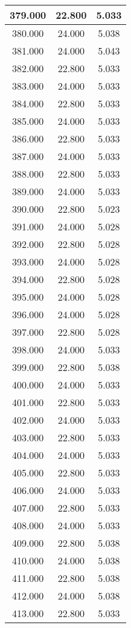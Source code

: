 \documentclass[11pt,a4paper]{jsarticle}
\begin{document}
\begin{center}
\begin{longtable}{|c|c|c|}
379.000	 & 22.800&  5.033 \\ \hline
380.000	 & 24.000&  5.038 \\ \hline
381.000	 & 24.000&  5.043 \\ \hline
382.000	 & 22.800&  5.033 \\ \hline
383.000	 & 24.000&  5.033 \\ \hline
384.000	 & 22.800&  5.033 \\ \hline
385.000	 & 24.000&  5.033 \\ \hline
386.000	 & 22.800&  5.033 \\ \hline
387.000	 & 24.000&  5.033 \\ \hline
388.000	 & 22.800&  5.033 \\ \hline
389.000	 & 24.000&  5.033 \\ \hline
390.000	 & 22.800&  5.023 \\ \hline
391.000	 & 24.000&  5.028 \\ \hline
392.000	 & 22.800&  5.028 \\ \hline
393.000	 & 24.000&  5.028 \\ \hline
394.000	 & 22.800&  5.028 \\ \hline
395.000	 & 24.000&  5.028 \\ \hline
396.000	 & 24.000&  5.028 \\ \hline
397.000	 & 22.800&  5.028 \\ \hline
398.000	 & 24.000&  5.033 \\ \hline
399.000	 & 22.800&  5.038 \\ \hline
400.000	 & 24.000&  5.033 \\ \hline
401.000	 & 22.800&  5.033 \\ \hline
402.000	 & 24.000&  5.033 \\ \hline
403.000	 & 22.800&  5.033 \\ \hline
404.000	 & 24.000&  5.033 \\ \hline
405.000	 & 22.800&  5.033 \\ \hline
406.000	 & 24.000&  5.033 \\ \hline
407.000	 & 22.800&  5.033 \\ \hline
408.000	 & 24.000&  5.033 \\ \hline
409.000	 & 22.800&  5.038 \\ \hline
410.000	 & 24.000&  5.038 \\ \hline
411.000	 & 22.800&  5.038 \\ \hline
412.000	 & 24.000&  5.038 \\ \hline
413.000	 & 22.800&  5.033 \\ \hline

\end{longtable}
\end{center}
\end{document}
